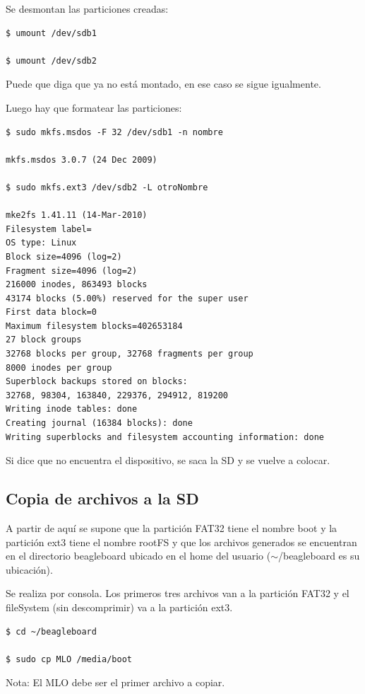 Se desmontan las particiones creadas: 

\begin{verbatim}
$ umount /dev/sdb1

$ umount /dev/sdb2
\end{verbatim}

Puede que diga que ya no está montado, en ese caso se sigue igualmente. 

\bigskip
Luego hay que formatear las particiones: 

\begin{verbatim}
$ sudo mkfs.msdos -F 32 /dev/sdb1 -n nombre

mkfs.msdos 3.0.7 (24 Dec 2009) 

$ sudo mkfs.ext3 /dev/sdb2 -L otroNombre

mke2fs 1.41.11 (14-Mar-2010) 
Filesystem label= 
OS type: Linux 
Block size=4096 (log=2) 
Fragment size=4096 (log=2) 
216000 inodes, 863493 blocks 
43174 blocks (5.00%) reserved for the super user 
First data block=0 
Maximum filesystem blocks=402653184 
27 block groups 
32768 blocks per group, 32768 fragments per group 
8000 inodes per group 
Superblock backups stored on blocks: 
32768, 98304, 163840, 229376, 294912, 819200 
Writing inode tables: done 
Creating journal (16384 blocks): done 
Writing superblocks and filesystem accounting information: done
\end{verbatim}

Si dice que no encuentra el dispositivo, se saca la SD y se vuelve a colocar.

\newpage
\subsection{Copia de archivos a la SD}

A partir de aquí se supone que la partición FAT32 tiene el nombre boot y la partición ext3 tiene el nombre rootFS y que los archivos generados se encuentran en el directorio beagleboard ubicado en el home del usuario ($\sim$/beagleboard es su ubicación).

\bigskip
Se realiza por consola. 
Los primeros tres archivos van a la partición FAT32 y el fileSystem (sin descomprimir) va a la 
partición ext3.

\begin{verbatim}
$ cd ~/beagleboard

$ sudo cp MLO /media/boot
\end{verbatim}

Nota: El MLO debe ser el primer archivo a copiar.

